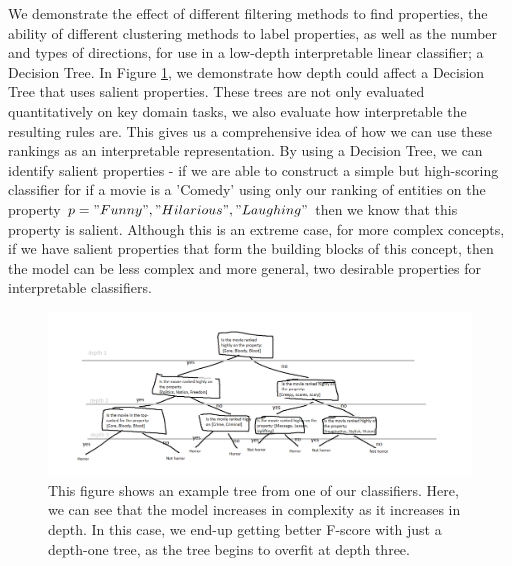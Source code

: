 
We demonstrate the effect of different filtering methods to find properties, the ability of different clustering methods to label properties, as well as the number and types of directions, for use in a low-depth interpretable linear classifier; a Decision Tree. In Figure \ref{IntroDecisionTree}, we demonstrate how depth could affect a Decision Tree that uses salient properties. These trees are not only evaluated quantitatively on key domain tasks, we also evaluate how interpretable the resulting rules are. This gives us a comprehensive idea of how we can use these rankings as an interpretable representation. By using a Decision Tree, we can identify salient properties - if we are able to construct a simple but high-scoring classifier for if a movie is a 'Comedy' using only our ranking of entities on the property $p = {"Funny", "Hilarious", "Laughing"}$ then we know that this property is salient. Although this is an extreme case, for more complex concepts, if we have salient properties that form the building blocks of this concept, then the model can be less complex and more general, two desirable properties for interpretable classifiers. 

\begin{figure}[t]
	\includegraphics[width=\textwidth]{images/decisiontree.png}
	\centering
	\caption{This figure shows an example tree from one of our classifiers. Here, we can see that the model increases in complexity as it increases in depth. In this case, we end-up getting better F-score with just a depth-one tree, as the tree begins to overfit at depth three.  }\label{IntroDecisionTree}
\end{figure}



